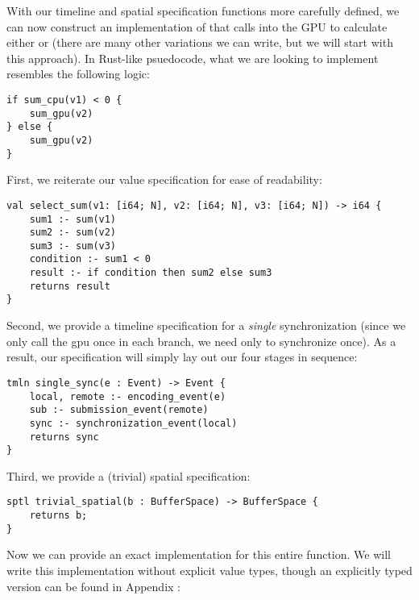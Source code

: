 With our timeline and spatial specification functions more carefully defined, we can now construct an implementation of  that calls into the GPU to calculate either  or  (there are many other variations we can write, but we will start with this approach).  In Rust-like psuedocode, what we are looking to implement resembles the following logic:
%
\begin{lstlisting}
if sum_cpu(v1) < 0 {
    sum_gpu(v2)
} else {
    sum_gpu(v2)
}
\end{lstlisting}
%
First, we reiterate our value specification for ease of readability:
%
\begin{lstlisting}
val select_sum(v1: [i64; N], v2: [i64; N], v3: [i64; N]) -> i64 {
    sum1 :- sum(v1)
    sum2 :- sum(v2)
    sum3 :- sum(v3)
    condition :- sum1 < 0
    result :- if condition then sum2 else sum3
    returns result
}
\end{lstlisting}
%
Second, we provide a timeline specification for a \emph{single} synchronization (since we only call the gpu once in each branch, we need only to synchronize once).  As a result, our specification will simply lay out our four stages in sequence:
%
\begin{lstlisting}
tmln single_sync(e : Event) -> Event {
    local, remote :- encoding_event(e)
    sub :- submission_event(remote)
    sync :- synchronization_event(local)
    returns sync
}
\end{lstlisting}
%
Third, we provide a (trivial) spatial specification:
%
\begin{lstlisting}
sptl trivial_spatial(b : BufferSpace) -> BufferSpace {
    returns b;
}
\end{lstlisting}
%
Now we can provide an exact implementation for this entire function.  We will write this implementation without explicit value types, though an explicitly typed version can be found in Appendix :
%
